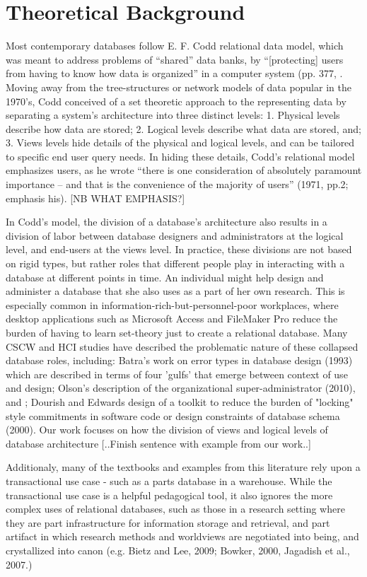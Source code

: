 \section{Theoretical Background}
Most contemporary databases follow E. F. Codd relational data model, which was meant to address problems of “shared” data banks, by  “[protecting] users from having to know how data is organized” in a computer system (pp. 377, \cite{Codd_1970}. Moving away from the tree-structures or network models of data popular in the 1970's, Codd conceived of a set theoretic approach to the representing data by separating a system's architecture into three distinct levels: 1. Physical levels describe how data are stored; 2. Logical levels describe what data are stored, and; 3. Views levels hide details of the physical and logical levels, and can be tailored to specific end user query needs. In hiding these details, Codd's relational model emphasizes users, as he wrote “there is one consideration of absolutely paramount importance – and that is the convenience of the majority of users” (1971, pp.2; emphasis his). [NB WHAT EMPHASIS?]

In Codd's model, the division of a database's architecture also results in a division of labor between database designers and administrators at the logical level, and end-users at the views level. In practice, these divisions are not based on rigid types, but rather roles that different people play in interacting with a database at different points in time. An individual might help design and administer a database that she also uses as a part of her own research. This is especially common in information-rich-but-personnel-poor workplaces, where desktop applications such as Microsoft Access and FileMaker Pro reduce the burden of having to learn set-theory just to create a relational database. Many CSCW and HCI studies have described the problematic nature of these collapsed database roles, including: Batra's work on error types in database design (1993) which are described in terms of  four 'gulfs' that emerge between context of use and design; Olson's description of the organizational super-administrator (2010), and ; Dourish and Edwards design of a toolkit to reduce the burden of "locking" style commitments in software code or design constraints of database schema (2000). Our work focuses on how the division of views and logical levels of database architecture [..Finish sentence with example from our work..] 

Additionaly, many of the textbooks and examples from this literature rely upon a transactional use case - such as a parts database in a warehouse. While the transactional use case is a helpful pedagogical tool, it also  ignores the more complex uses of relational databases, such as those in a research setting where they are part infrastructure for information storage and retrieval, and part artifact in which research methods and worldviews are negotiated into being, and crystallized into canon (e.g. Bietz and Lee, 2009; Bowker, 2000, Jagadish et al., 2007.)  

